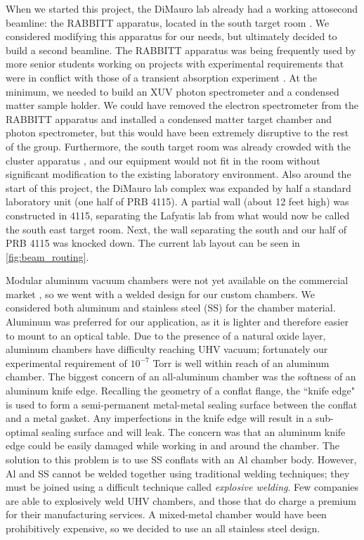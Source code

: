 When we started this project, the DiMauro lab already had a working attosecond beamline: the RABBITT apparatus, located in the south target room \cite{chirlaAttosecondPulseGeneration2011}. We considered modifying this apparatus for our needs, but ultimately decided to build a second beamline. The RABBITT apparatus was being frequently used by more senior students working on projects with experimental requirements that were in conflict with those of a transient absorption experiment \cite{kiesewetterDynamicsNearThresholdAttosecond2019,gormanAttosecondProbingElectron2018}. At the minimum, we needed to build an XUV photon spectrometer and a condensed matter sample holder. We could have removed the electron spectrometer from the RABBITT apparatus and installed a condensed matter target chamber and photon spectrometer, but this would have been extremely disruptive to the rest of the group. Furthermore, the south target room was already crowded with the cluster apparatus \cite{wangMidinfraredStrongfieldLaser2018}, and our equipment would not fit in the room without significant modification to the existing laboratory environment. Also around the start of this project, the DiMauro lab complex was expanded by half a standard laboratory unit (one half of PRB 4115). A partial wall (about 12 feet high) was constructed in 4115, separating the Lafyatis lab from what would now be called the south east target room. Next, the wall separating the south and our half of PRB 4115 was knocked down. The current lab layout can be seen in \cref{fig:beam_routing}.

Modular aluminum vacuum chambers were not yet available on the commercial market \cite{piperAndrewPiperDissertation2022}, so we went with a welded design for our custom chambers. We considered both aluminum and stainless steel (SS) for the chamber material. Aluminum was preferred for our application, as it is lighter and therefore easier to mount to an optical table. Due to the presence of a natural oxide layer, aluminum chambers have difficulty reaching UHV vacuum; fortunately our experimental requirement of $10^{-7}$ Torr is well within reach of an aluminum chamber. The biggest concern of an all-aluminum chamber was the softness of an aluminum knife edge. Recalling the geometry of a conflat flange, the ``knife edge" is used to form a semi-permanent metal-metal sealing surface between the conflat and a metal gasket. Any imperfections in the knife edge will result in a sub-optimal sealing surface and will leak. The concern was that an aluminum knife edge could be easily damaged while working in and around the chamber. The solution to this problem is to use SS conflats with an Al chamber body. However, Al and SS cannot be welded together using traditional welding techniques; they must be joined using a difficult technique called \textit{explosive welding}. Few companies are able to explosively weld UHV chambers, and those that do charge a premium for their manufacturing services. A mixed-metal chamber would have been prohibitively expensive, so we decided to use an all stainless steel design.

